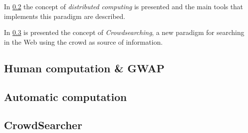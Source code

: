In \ref{sec:bg:crowd:auto} the concept of \emph{distributed computing} is
presented and the main tools that implements this paradigm are described.

In \ref{sec:bg:crowd:cs} is presented the concept of \emph{Crowdsearching},
a new paradigm for searching in the Web using the crowd as source of information.


\subsection{Human computation \& \acs{GWAP}}
\label{sec:bg:crowd:human}


\subsection{Automatic computation}
\label{sec:bg:crowd:auto}


\subsection{CrowdSearcher}
\label{sec:bg:crowd:cs}
